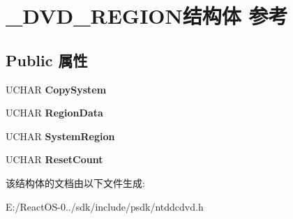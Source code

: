\hypertarget{struct___d_v_d___r_e_g_i_o_n}{}\section{\+\_\+\+D\+V\+D\+\_\+\+R\+E\+G\+I\+O\+N结构体 参考}
\label{struct___d_v_d___r_e_g_i_o_n}
\subsection*{Public 属性}
\begin{DoxyCompactItemize}
\item 
\mbox{\label{struct___d_v_d___r_e_g_i_o_n_a2d167e7f349eef82a3e9593119147e4c}} 
U\+C\+H\+AR {\bfseries Copy\+System}
\item 
\mbox{\label{struct___d_v_d___r_e_g_i_o_n_a915d1f9ebfb74128a1263acfaf3da3db}} 
U\+C\+H\+AR {\bfseries Region\+Data}
\item 
\mbox{\label{struct___d_v_d___r_e_g_i_o_n_ac6b1b66883e77a783cb992e2386059bf}} 
U\+C\+H\+AR {\bfseries System\+Region}
\item 
\mbox{\label{struct___d_v_d___r_e_g_i_o_n_a0c02d1c8406e25e64fde1b691e36de8b}} 
U\+C\+H\+AR {\bfseries Reset\+Count}
\end{DoxyCompactItemize}


该结构体的文档由以下文件生成\+:\begin{DoxyCompactItemize}
\item 
E\+:/\+React\+O\+S-\/0../sdk/include/psdk/ntddcdvd.\+h\end{DoxyCompactItemize}
